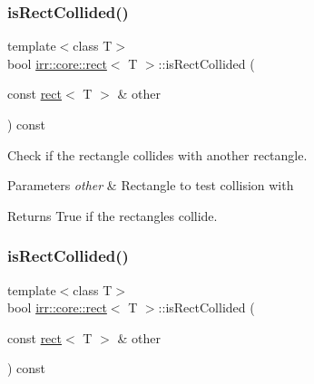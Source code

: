 \subsubsection{\texorpdfstring{is\+Rect\+Collided()}{isRectCollided()}\hspace{0.1cm}{\footnotesize\ttfamily [1/2]}}
{\footnotesize\ttfamily template$<$class T$>$ \\
bool \hyperlink{classirr_1_1core_1_1rect}{irr\+::core\+::rect}$<$ T $>$\+::is\+Rect\+Collided (\begin{DoxyParamCaption}\item[{const \hyperlink{classirr_1_1core_1_1rect}{rect}$<$ T $>$ \&}]{other }\end{DoxyParamCaption}) const\hspace{0.3cm}{\ttfamily [inline]}}



Check if the rectangle collides with another rectangle. 


\begin{DoxyParams}{Parameters}
{\em other} & Rectangle to test collision with \\
\hline
\end{DoxyParams}
\begin{DoxyReturn}{Returns}
True if the rectangles collide. 
\end{DoxyReturn}
\mbox{\label{classirr_1_1core_1_1rect_ab94b7d9da434c7b08761426e296c2f3e}} 
\subsubsection{\texorpdfstring{is\+Rect\+Collided()}{isRectCollided()}\hspace{0.1cm}{\footnotesize\ttfamily [2/2]}}
{\footnotesize\ttfamily template$<$class T$>$ \\
bool \hyperlink{classirr_1_1core_1_1rect}{irr\+::core\+::rect}$<$ T $>$\+::is\+Rect\+Collided (\begin{DoxyParamCaption}\item[{const \hyperlink{classirr_1_1core_1_1rect}{rect}$<$ T $>$ \&}]{other }\end{DoxyParamCaption}) const\hspace{0.3cm}{\ttfamily [inline]}}



